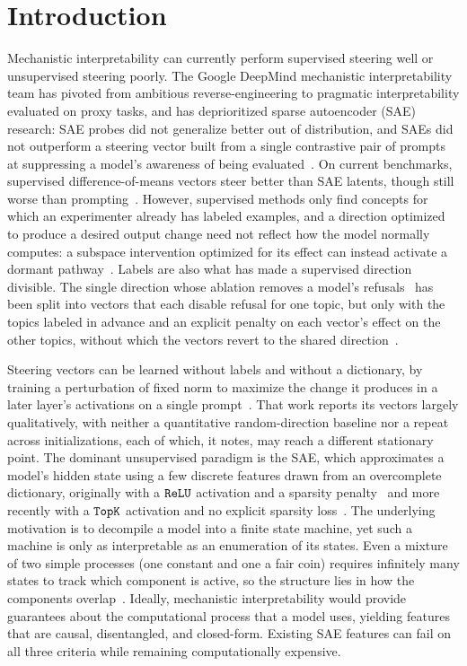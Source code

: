 \section{Introduction}
\label{sec:intro}

Mechanistic interpretability can currently perform supervised steering
well or unsupervised steering poorly. The Google DeepMind mechanistic
interpretability team has pivoted from ambitious reverse-engineering to
pragmatic interpretability evaluated on proxy tasks, and has deprioritized
sparse autoencoder (SAE) research: SAE probes did not generalize better
out of distribution, and SAEs did not outperform a steering vector built
from a single contrastive pair of prompts at suppressing a model's
awareness of being evaluated~\cite{gdmprogress2025}. On current
benchmarks, supervised difference-of-means vectors steer better than SAE
latents, though still worse than
prompting~\cite{wu2025axbenchsteeringllmssimple}. However, supervised
methods only find concepts for which an experimenter already has labeled
examples, and a direction optimized to produce a desired output change
need not reflect how the model normally computes: a subspace intervention
optimized for its effect can instead activate a dormant
pathway~\cite{makelov2023}. Labels are also what has made a supervised
direction divisible. The single direction whose ablation removes a
model's refusals~\cite{arditi2024} has been split into vectors that each
disable refusal for one topic, but only with the topics labeled in
advance and an explicit penalty on each vector's effect on the other
topics, without which the vectors revert to the shared
direction~\cite{tong2025meuv}.

Steering vectors can be learned without labels and without a dictionary,
by training a perturbation of fixed norm to maximize the change it
produces in a later layer's activations on a single
prompt~\cite{mack2024melbo}. That work reports its vectors largely
qualitatively, with neither a quantitative random-direction baseline nor
a repeat across initializations, each of which, it notes, may reach a
different stationary point. The dominant unsupervised paradigm is the SAE, which approximates a
model's hidden state using a few discrete features drawn from an
overcomplete dictionary, originally with a $\mathop{\mathtt{ReLU}}\limits$ activation and a
sparsity penalty~\cite{cunningham2023,bricken2023} and more recently with
a $\mathop{\mathtt{TopK}}\limits$ activation and no explicit sparsity loss~\cite{gao2024}. The
underlying motivation is to decompile a model into a finite state
machine, yet such a machine is only as interpretable as an enumeration of
its states. Even a mixture of two simple processes (one constant and one
a fair coin) requires infinitely many states to track which component is
active, so the structure lies in how the components
overlap~\cite{crutchfield2026}. Ideally, mechanistic interpretability
would provide guarantees about the computational process that a model
uses, yielding features that are causal, disentangled, and closed-form.
Existing SAE features can fail on all three criteria while remaining
computationally expensive.

